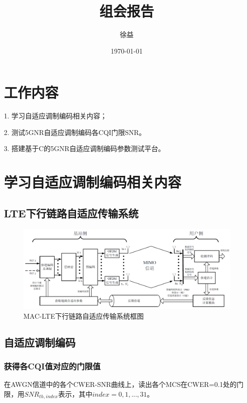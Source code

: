 \documentclass{article}
\title{组会报告}
\author{徐益}
\date{\today}
\begin{document}
\maketitle


\section{工作内容} 
1. 学习自适应调制编码相关内容；

2. 测试5GNR自适应调制编码各CQI门限SNR。

3. 搭建基于C的5GNR自适应调制编码参数测试平台。

\section{学习自适应调制编码相关内容}
\subsection{LTE下行链路自适应传输系统}
\begin{figure}[H]
	\centering
	\includegraphics[width = \textwidth]{system.png}
	\caption{MAC-LTE下行链路自适应传输系统框图}
\end{figure}
\subsection{自适应调制编码}
\subsubsection{获得各CQI值对应的门限值}
在AWGN信道中的各个CWER-SNR曲线上，读出各个MCS在CWER=0.1处的门限，用$SNR_{th,index}$表示，其中$index=0,1,...,31$。
\end{document}
